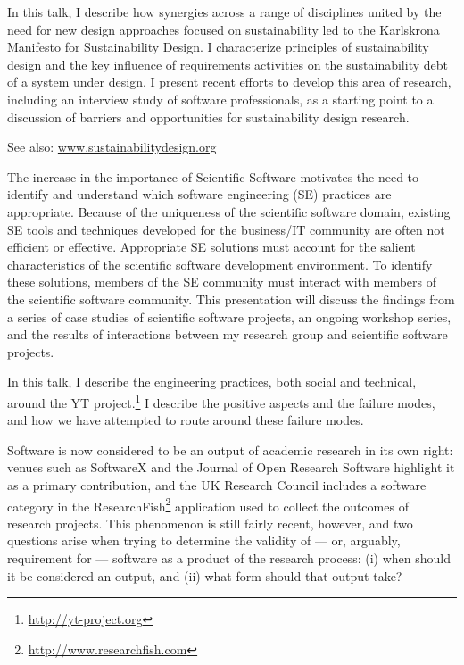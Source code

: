 \documentclass[a4paper,UKenglish]{dagrep}
\begin{document}
In this talk, I describe how synergies across a range of disciplines united by the need for new design approaches focused on sustainability led to the Karlskrona Manifesto for Sustainability Design. I characterize principles of sustainability design and the key influence of requirements activities on the sustainability debt of a system under design. I present recent efforts to develop this area of research, including an interview study of software professionals, as a starting point to a discussion of barriers and opportunities for sustainability design research.

See also: \url{www.sustainabilitydesign.org}


The increase in the importance of Scientific Software motivates the need to identify and understand which software engineering (SE) practices are appropriate. Because of the uniqueness of the scientific software domain, existing SE tools and techniques developed for the business/IT community are often not efficient or effective. Appropriate SE solutions must account for the salient characteristics of the scientific software development environment. To identify these solutions, members of the SE community must interact with members of the scientific software community. This presentation will discuss the findings from a series of case studies of scientific software projects, an ongoing workshop series, and the results of interactions between my research group and scientific software projects.


In this talk, I describe the engineering practices, both social and
technical, around the YT project.\footnote{\url{http://yt-project.org}}  I describe the
positive aspects and the failure modes, and how we have attempted to
route around these failure modes.


Software is now considered to be an output of academic research in its own right: venues such as SoftwareX and the Journal of Open Research Software highlight it as a primary contribution, and the UK Research Council includes a software category in the ResearchFish\footnote{\url{http://www.researchfish.com}} application used to collect the outcomes of research projects. This phenomenon is still fairly recent, however, and two questions arise when trying to determine the validity of --- or, arguably, requirement for --- software as a product of the research process: (i) when should it be considered an output, and (ii) what form should that output take?
\end{document}

